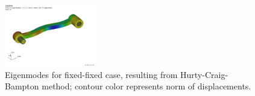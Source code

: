 \begin{figure}[tbph]
\begin{center}
  \includegraphics[width=4cm]{figures/modesHinge/HCBmodesHingeEigenmode7}
  \end{center}
  \caption{Eigenmodes for fixed-fixed case, resulting from Hurty-Craig-Bampton method; contour color represents norm of displacements.}
	\label{fig_hingePartFixedFixedModes}
\end{figure}

